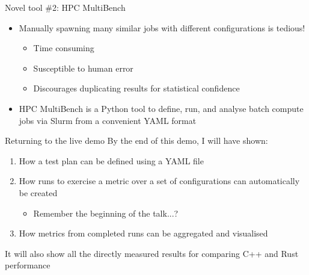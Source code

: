 \documentclass[10pt,aspectratio=169]{beamer}
\begin{document}
\begin{frame}{Novel tool \#2: HPC MultiBench}
    \begin{itemize}
        \item<1-> Manually spawning many similar jobs with different configurations is tedious!
        \begin{itemize}
            \item Time consuming
            \item Susceptible to human error
            \item Discourages duplicating results for statistical confidence
        \end{itemize}
        \vspace{0.5cm}
        \item<2-> HPC MultiBench is a Python tool to define, run, and analyse batch compute jobs via Slurm from a convenient YAML format
    \end{itemize}
\end{frame}

\begin{frame}{Returning to the live demo}
    By the end of this demo, I will have shown:
    \begin{enumerate}
        \item <1-> How a test plan can be defined using a YAML file
        \item <2-> How runs to exercise a metric over a set of configurations can automatically be created
        \begin{itemize}
            \item Remember the beginning of the talk...?
        \end{itemize}
        \item <3-> How metrics from completed runs can be aggregated and visualised
    \end{enumerate}
    \vspace*{0.5cm}
    \alert{It will also show all the directly measured results for comparing C++ and Rust performance}
\end{frame}





\end{document}
